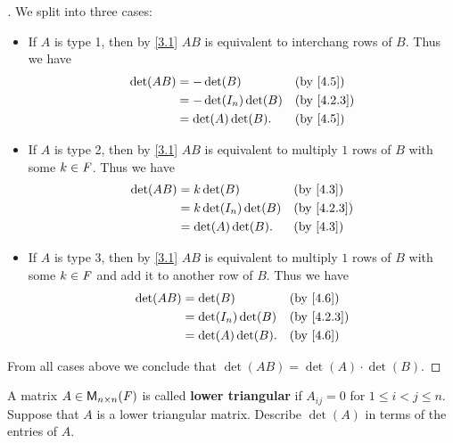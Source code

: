 \begin{proof}[]
	We split into three cases:
	\begin{itemize}
		\item If \(A\) is type 1, then by \cref{3.1} \(AB\) is equivalent to interchang rows of \(B\).
		      Thus we have
		      \begin{align*}
			      \det(AB) & = -\det(B)           &  & \by{4.5}   \\
			               & = -\det(I_n) \det(B) &  & \by{4.2.3} \\
			               & = \det(A) \det(B).   &  & \by{4.5}
		      \end{align*}
		\item If \(A\) is type 2, then by \cref{3.1} \(AB\) is equivalent to multiply \(1\) rows of \(B\) with some \(k \in \mathit{F}\).
		      Thus we have
		      \begin{align*}
			      \det(AB) & = k \det(B)           &  & \by{4.3}   \\
			               & = k \det(I_n) \det(B) &  & \by{4.2.3} \\
			               & = \det(A) \det(B).    &  & \by{4.3}
		      \end{align*}
		\item If \(A\) is type 3, then by \cref{3.1} \(AB\) is equivalent to multiply \(1\) rows of \(B\) with some \(k \in \mathit{F}\) and add it to another row of \(B\).
		      Thus we have
		      \begin{align*}
			      \det(AB) & = \det(B)           &  & \by{4.6}   \\
			               & = \det(I_n) \det(B) &  & \by{4.2.3} \\
			               & = \det(A) \det(B).  &  & \by{4.6}
		      \end{align*}
	\end{itemize}
	From all cases above we conclude that \(\det(AB) = \det(A) \cdot \det(B)\).
\end{proof}

\begin{ex}\label{ex:4.3.19}
	A matrix \(A \in \ms[n][n][\F]\) is called \textbf{lower triangular} if \(A_{i j} = 0\) for \(1 \leq i < j \leq n\).
	Suppose that \(A\) is a lower triangular matrix.
	Describe \(\det(A)\) in terms of the entries of \(A\).
\end{ex}

